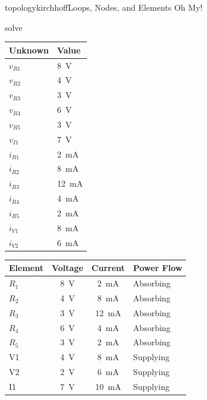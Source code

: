 \begin{mainquestion}{topologykirchhoff}{Loops, Nodes, and Elements Oh My!}
\begin{partquestion}{solve}
\begin{answer}
\begin{table}[htbp]
\begin{minipage}[t]{0.37\textwidth}
\centering
\begin{tabular}{|l|l|}
\hline
Unknown & Value \\ \hline
$v_{R1}$ & \qty{8}{\volt} \\ \hline
$v_{R2}$ & \qty{4}{\volt} \\ \hline
$v_{R3}$ & \qty{3}{\volt} \\ \hline
$v_{R4}$ & \qty{6}{\volt} \\ \hline
$v_{R5}$ & \qty{3}{\volt} \\ \hline
$v_{I1}$ & \qty{7}{\volt} \\ \hline
$i_{R1}$ & \qty{2}{\milli\ampere} \\ \hline
$i_{R2}$ & \qty{8}{\milli\ampere} \\ \hline
$i_{R3}$ & \qty{12}{\milli\ampere} \\ \hline
$i_{R4}$ & \qty{4}{\milli\ampere} \\ \hline
$i_{R5}$ & \qty{2}{\milli\ampere} \\ \hline
$i_{V1}$ & \qty{8}{\milli\ampere} \\ \hline
$i_{V2}$ & \qty{6}{\milli\ampere} \\ \hline
\end{tabular}
\end{minipage}
\hfill
\begin{minipage}[t]{0.60\textwidth}
\centering
\begin{tabular}{|l|c|c|l|}
\hline
Element & Voltage & Current & Power Flow \\ \hline
$R_1$ & \qty{8}{\volt} & \qty{2}{\milli\ampere} & Absorbing \\ \hline
$R_2$ & \qty{4}{\volt} & \qty{8}{\milli\ampere} & Absorbing \\ \hline
$R_3$ & \qty{3}{\volt} & \qty{12}{\milli\ampere} & Absorbing \\ \hline
$R_4$ & \qty{6}{\volt} & \qty{4}{\milli\ampere} & Absorbing \\ \hline
$R_5$ & \qty{3}{\volt} & \qty{2}{\milli\ampere} & Absorbing \\ \hline
V1 & \qty{4}{\volt} & \qty{8}{\milli\ampere} & Supplying \\ \hline
V2 & \qty{2}{\volt} & \qty{6}{\milli\ampere} & Supplying \\ \hline
I1 & \qty{7}{\volt} & \qty{10}{\milli\ampere} & Supplying \\ \hline
\end{tabular}
\end{minipage}


\end{table}
\end{answer}
\end{partquestion}
\end{mainquestion}
